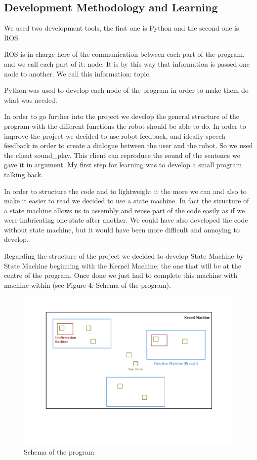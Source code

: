 \subsection{Development Methodology and Learning}

We used two development tools, the first one is Python and the second one is ROS. 

ROS is in charge here of the communication between each part of the program, and we call each part of it: node. It is by this way that information is passed one node to another. We call this information: topic. 

Python was used to develop each node of the program in order to make them do what was needed.

In order to go further into the project we develop the general structure of the program with the different functions the robot should be able to do. In order to improve the project we decided to use robot feedback, and ideally speech feedback in order to create a dialogue between the user and the robot. So we used the client sound\_play. This client can reproduce the sound of the sentence we gave it in argument. My first step for learning was to develop a small program talking back.

In order to structure the code and to lightweight it the more we can and also to make it easier to read we decided to use a state machine. In fact the structure of a state machine allows us to assembly and reuse part of the code easily as if we were imbricating one state after another. We could have also developed the code without state machine, but it would have been more difficult and annoying to develop.

Regarding the structure of the project we decided to develop State Machine by State Machine beginning with the Kernel Machine, the one that will be at the centre of the program. Once done we just had to complete this machine with machine within (see Figure 4: Schema of the program).

 \begin{figure}
 \center
 \includegraphics[width=15cm]{img/SimplificationMachineProgram.pdf}
 \caption{Schema of the program}
 \end{figure}

